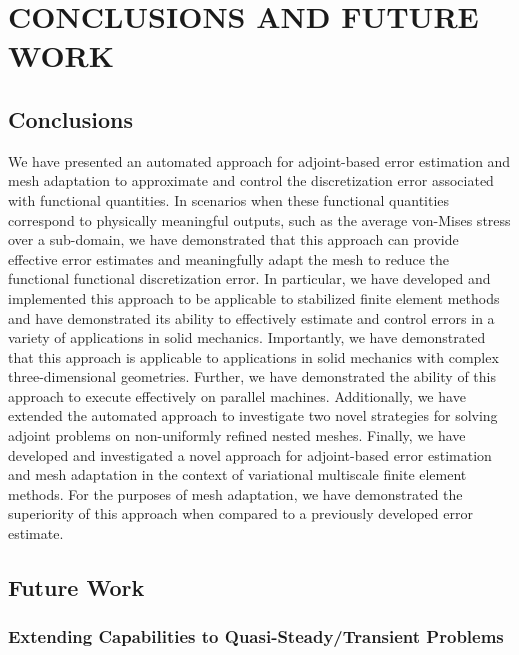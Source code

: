 \chapter{CONCLUSIONS AND FUTURE WORK}
\label{chap:conclusions}

\section{Conclusions}

We have presented an automated approach for adjoint-based error estimation and mesh
adaptation to approximate and control the discretization error associated with
functional quantities. In scenarios when these functional quantities correspond
to physically meaningful outputs, such as the average von-Mises stress over a
sub-domain, we have demonstrated that this approach can provide effective error
estimates and meaningfully adapt the mesh to reduce the functional functional
discretization error. In particular, we have developed and implemented this approach
to be applicable to stabilized finite element methods and have demonstrated its
ability to effectively estimate and control errors in a variety of applications
in solid mechanics. Importantly, we have demonstrated that this approach is applicable
to applications in solid mechanics with complex three-dimensional geometries.
Further, we have demonstrated the ability of this approach
to execute effectively on parallel machines. Additionally, we have extended the
automated approach to investigate two novel strategies for solving adjoint problems
on non-uniformly refined nested meshes. Finally, we have developed and
investigated a novel approach for adjoint-based error estimation and mesh adaptation
in the context of variational multiscale finite element methods. For the purposes
of mesh adaptation, we have demonstrated the superiority of this approach when compared
to a previously developed error estimate.

\section{Future Work}

\subsection{Extending Capabilities to Quasi-Steady/Transient Problems}

